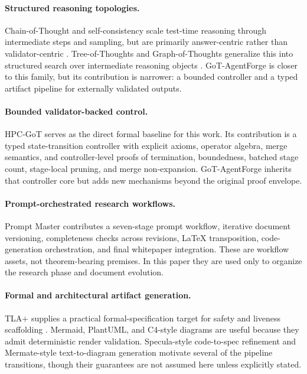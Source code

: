 \documentclass[11pt,a4paper,oneside]{article}
\begin{document}
\paragraph{Structured reasoning topologies.}
Chain-of-Thought and self-consistency scale test-time reasoning through intermediate steps and sampling, but are primarily answer-centric rather than validator-centric \citep{wei2022cot, wang2022selfconsistency}. Tree-of-Thoughts and Graph-of-Thoughts generalize this into structured search over intermediate reasoning objects \citep{yao2023tot, besta2023graph, besta2024graph}. GoT-AgentForge is closer to this family, but its contribution is narrower: a bounded controller and a typed artifact pipeline for externally validated outputs.

\paragraph{Bounded validator-backed control.}
HPC-GoT serves as the direct formal baseline for this work. Its contribution is a typed state-transition controller with explicit axioms, operator algebra, merge semantics, and controller-level proofs of termination, boundedness, batched stage count, stage-local pruning, and merge non-expansion. GoT-AgentForge inherits that controller core but adds new mechanisms beyond the original proof envelope.

\paragraph{Prompt-orchestrated research workflows.}
Prompt Master contributes a seven-stage prompt workflow, iterative document versioning, completeness checks across revisions, LaTeX transposition, code-generation orchestration, and final whitepaper integration. These are workflow assets, not theorem-bearing premises. In this paper they are used only to organize the research phase and document evolution.

\paragraph{Formal and architectural artifact generation.}
TLA+ supplies a practical formal-specification target for safety and liveness scaffolding \citep{lamport2002specifying}. Mermaid, PlantUML, and C4-style diagrams are useful because they admit deterministic render validation. Specula-style code-to-spec refinement and Mermate-style text-to-diagram generation motivate several of the pipeline transitions, though their guarantees are not assumed here unless explicitly stated.
\end{document}
